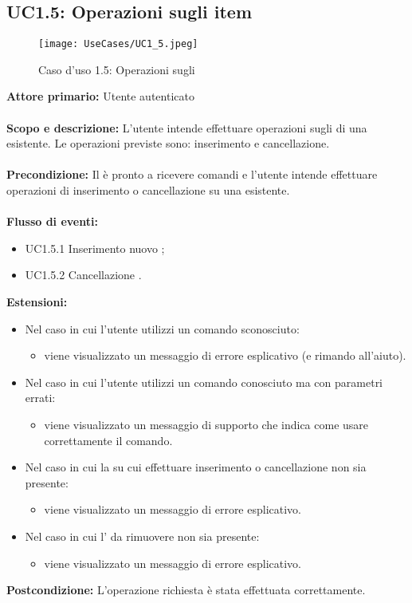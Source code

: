 \documentclass{scalatekids-article}
\begin{document}
\subsection{UC1.5: Operazioni sugli item}
\begin{figure}[H]
  \begin{center}
    \texttt{[image: UseCases/UC1\_5.jpeg]}
    \caption{Caso d'uso 1.5: Operazioni sugli }
  \end{center}
\end{figure}
\textbf{Attore primario:} Utente autenticato\\ \\
\textbf{Scopo e descrizione:} L'utente intende effettuare operazioni sugli  di una  esistente. Le operazioni previste sono:
inserimento e cancellazione.\\ \\
\textbf{Precondizione:} Il  è pronto a ricevere comandi e l'utente intende effettuare operazioni di inserimento o cancellazione su una  esistente.\\ \\
\textbf{Flusso di eventi:}
\begin{itemize}
\item UC1.5.1 Inserimento nuovo ;
\item UC1.5.2 Cancellazione .
\end{itemize}
\textbf{Estensioni:}
\begin{itemize}
\item Nel caso in cui l'utente utilizzi un comando sconosciuto:
  \begin{itemize}
  \item viene visualizzato un messaggio di errore esplicativo (e rimando all'aiuto).
  \end{itemize}
\item Nel caso in cui l'utente utilizzi un comando conosciuto ma con parametri errati:
  \begin{itemize}
  \item viene visualizzato un messaggio di supporto che indica come usare correttamente il comando.
  \end{itemize}
\item Nel caso in cui la  su cui effettuare inserimento o cancellazione non sia presente:
  \begin{itemize}
  \item viene visualizzato un messaggio di errore esplicativo.
  \end{itemize}
\item Nel caso in cui l' da rimuovere non sia presente:
  \begin{itemize}
  \item viene visualizzato un messaggio di errore esplicativo.
  \end{itemize}
\end{itemize}
\textbf{Postcondizione:} L'operazione richiesta è stata effettuata correttamente.
\end{document}
